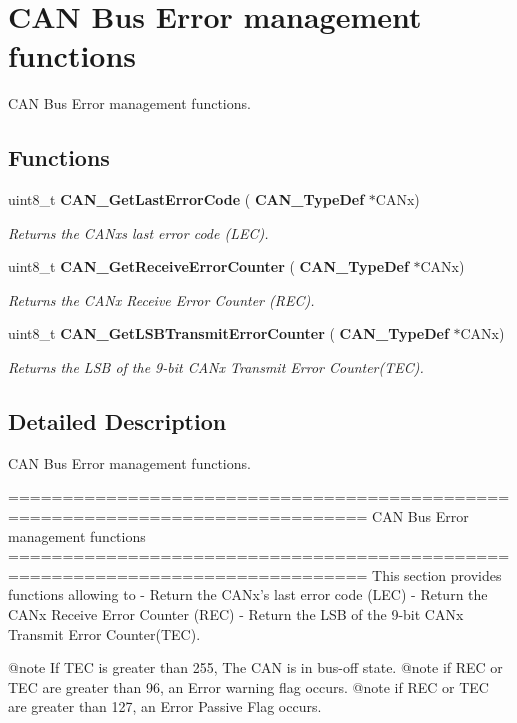 \section{C\+AN Bus Error management functions}
\label{group__CAN__Group5}


C\+AN Bus Error management functions.  


\subsection*{Functions}
\begin{DoxyCompactItemize}
\item 
uint8\+\_\+t \textbf{ C\+A\+N\+\_\+\+Get\+Last\+Error\+Code} (\textbf{ C\+A\+N\+\_\+\+Type\+Def} $\ast$C\+A\+Nx)
\begin{DoxyCompactList}\small\item\em Returns the C\+A\+Nx\textquotesingle{}s last error code (L\+EC). \end{DoxyCompactList}\item 
uint8\+\_\+t \textbf{ C\+A\+N\+\_\+\+Get\+Receive\+Error\+Counter} (\textbf{ C\+A\+N\+\_\+\+Type\+Def} $\ast$C\+A\+Nx)
\begin{DoxyCompactList}\small\item\em Returns the C\+A\+Nx Receive Error Counter (R\+EC). \end{DoxyCompactList}\item 
uint8\+\_\+t \textbf{ C\+A\+N\+\_\+\+Get\+L\+S\+B\+Transmit\+Error\+Counter} (\textbf{ C\+A\+N\+\_\+\+Type\+Def} $\ast$C\+A\+Nx)
\begin{DoxyCompactList}\small\item\em Returns the L\+SB of the 9-\/bit C\+A\+Nx Transmit Error Counter(\+T\+E\+C). \end{DoxyCompactList}\end{DoxyCompactItemize}


\subsection{Detailed Description}
C\+AN Bus Error management functions. 

\begin{DoxyVerb} ===============================================================================
                      CAN Bus Error management functions
 ===============================================================================  
  This section provides functions allowing to 
   -  Return the CANx's last error code (LEC)
   -  Return the CANx Receive Error Counter (REC)
   -  Return the LSB of the 9-bit CANx Transmit Error Counter(TEC).
   
   @note If TEC is greater than 255, The CAN is in bus-off state.
   @note if REC or TEC are greater than 96, an Error warning flag occurs.
   @note if REC or TEC are greater than 127, an Error Passive Flag occurs.\end{DoxyVerb}
 

